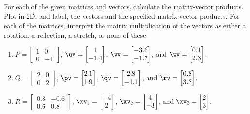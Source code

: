\begin{exercise} \label{ex:matvec2} 
For each of the given matrices and vectors, calculate the matrix-vector products.  
Plot in 2D, and label, the vectors and the specified matrix-vector products.
For each of the matrices, interpret the matrix multiplication of the vectors as either a rotation, a reflection, a stretch, or none of these.
\begin{enumerate}
\item \(P=\begin{bmatrix} 1&0\\0&-1 \end{bmatrix}\), 
\(\uv=\begin{bmatrix} 1\\-1.4 \end{bmatrix}\),
\(\vv=\begin{bmatrix} -3.6\\-1.7 \end{bmatrix}\), and
\(\wv=\begin{bmatrix} 0.1\\2.3 \end{bmatrix}\).


\item \(Q=\begin{bmatrix} 2&0\\0&2 \end{bmatrix}\), 
\(\pv=\begin{bmatrix} 2.1\\1.9 \end{bmatrix}\),
\(\qv=\begin{bmatrix} 2.8\\-1.1 \end{bmatrix}\), and
\(\rv=\begin{bmatrix} 0.8\\3.3 \end{bmatrix}\).


\item \(R=\begin{bmatrix} 0.8&-0.6
\\0.6& 0.8 \end{bmatrix}\), 
\(\xv_1=\begin{bmatrix} -4\\2 \end{bmatrix}\),
\(\xv_2=\begin{bmatrix} 4\\-3 \end{bmatrix}\), and
\(\xv_3=\begin{bmatrix} 2\\3 \end{bmatrix}\).



\end{enumerate}
\end{exercise}
